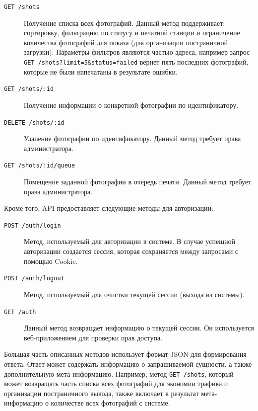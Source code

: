 \documentclass[a4paper,14pt,href]{article}
\begin{document}
\begin{description}
  \item[\texttt{GET /shots}] Получение списка всех фотографий. Данный метод поддерживает: сортировку, фильтрацию по
    статусу и печатной станции и ограничение количества фотографий для показа (для организации
    постраничной загрузки). Параметры фильтров являются частью адреса, например запрос \texttt{GET /shots?limit=5\&status=failed}
    вернет пять последних фотографий, которые не были напечатаны в результате ошибки.

  \item[\texttt{GET /shots/:id}] Получение информации о конкретной фотографии по идентификатору.
  \item[\texttt{DELETE /shots/:id}] Удаление фотографии по идентификатору. Данный метод требует права
    администратора.
  \item[\texttt{GET /shots/:id/queue}] Помещение заданной фотографии в очередь печати. Данный метод требует права
    администратора.
\end{description}

Кроме того, API предоставляет следующие методы для авторизации:
\begin{description}
  \item[\texttt{POST /auth/login}] Метод, используемый для авторизации в системе. В случае успешной авторизации создается
    сессия, которая сохраняется между запросами с помощью Cookie.

  \item[\texttt{POST /auth/logout}] Метод, используемый для очистки текущей сессии (выхода из системы).

  \item[\texttt{GET /auth}] Данный метод возвращает информацию о текущей сессии. Он используется веб-приложением для
    проверки прав доступа.
\end{description}

Большая часть описанных методов использует формат JSON для формирования ответа. Ответ может содержать информацию о
запрашиваемой сущности, а также дополнительную мета-информацию. Например, метод \texttt{GET /shots}, который может
возвращать часть списка всех фотографий для экономии трафика и организации постраничного вывода, также включает в результат
мета-информацию о количестве всех фотографий с системе.
\end{document}
